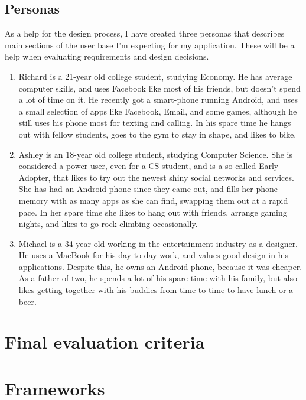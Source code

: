 \documentclass[]{report}
\begin{document}
\subsection{Personas}

As a help for the design process, I have created three personas that describes
main sections of the user base I'm expecting for my application. These will be a
help when evaluating requirements and design decisions.

\begin{enumerate}
\item Richard is a 21-year old college student, studying Economy. He has average
  computer skills, and uses Facebook like most of his friends, but doesn't spend
  a lot of time on it. He recently got a smart-phone running Android, and uses a
  small selection of apps like Facebook, Email, and some games, although he
  still uses his phone most for texting and calling. In his spare time he hangs
  out with fellow students, goes to the gym to stay in shape, and likes to bike.
\item Ashley is an 18-year old college student, studying Computer Science. She
  is considered a power-user, even for a CS-student, and is a so-called Early
  Adopter, that likes to try out the newest shiny social networks and
  services. She has had an Android phone since they came out, and fills her
  phone memory with as many apps as she can find, swapping them out at a rapid
  pace. In her spare time she likes to hang out with friends, arrange gaming
  nights, and likes to go rock-climbing occasionally.
\item Michael is a 34-year old working in the entertainment industry as a
  designer. He uses a MacBook for his day-to-day work, and values good design in
  his applications. Despite this, he owns an Android phone, because it was
  cheaper. As a father of two, he spends a lot of his spare time with his
  family, but also likes getting together with his buddies from time to time to
  have lunch or a beer.
\end{enumerate}

\section{Final evaluation criteria}

\section{Frameworks}
\end{document}
